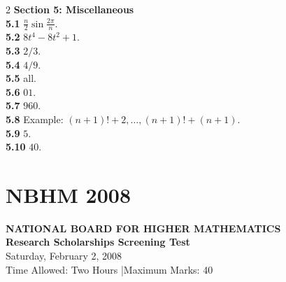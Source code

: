 \documentclass[11pt,a4paper]{article}
\newcommand{\examheader}[4]{%
  \clearpage
  \section{#1}
  \begin{center}
    {\large\bfseries NATIONAL BOARD FOR HIGHER MATHEMATICS}\\[3pt]
    {\bfseries #2}\\[2pt]
    {#3}\\[2pt]
    {\small #4}
  \end{center}
  \vspace{4pt}
}
\begin{document}
\begin{multicols}{2}
\medskip
\textbf{Section 5: Miscellaneous}\\
\textbf{5.1} $\frac{n}{2}\sin\frac{2\pi}{n}$.\\
\textbf{5.2} $8t^4 - 8t^2 + 1$.\\
\textbf{5.3} $2/3$.\\
\textbf{5.4} $4/9$.\\
\textbf{5.5} all.\\
\textbf{5.6} $01$.\\
\textbf{5.7} $960$.\\
\textbf{5.8} Example: $(n+1)! + 2, \dots, (n+1)! + (n+1)$.\\
\textbf{5.9} $5$.\\
\textbf{5.10} $40$.
\end{multicols}
\examheader{NBHM 2008}{Research Scholarships Screening Test}{Saturday, February 2, 2008}{Time Allowed: Two Hours \quad|\quad Maximum Marks: 40}
\end{document}
